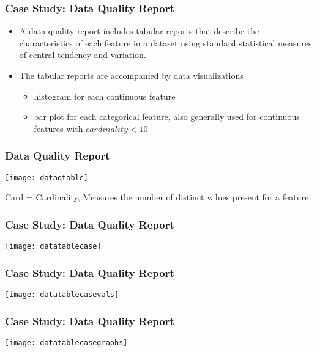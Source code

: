 \begin{frame}[fragile] \frametitle{Case Study: Data Quality Report}
\begin{itemize}
\item A data quality report includes tabular reports that describe the characteristics of each feature in a dataset using standard statistical measures of central tendency and variation. 
\item The tabular reports are accompanied by data visualizations
	\begin{itemize}
	\item histogram for each continuous feature
	\item bar plot for each categorical feature, also generally used for continuous features with $cardinality < 10$
	\end{itemize}
\end{itemize}
\end{frame}

\begin{frame}[fragile] \frametitle{Data Quality Report}
\begin{center}
\texttt{[image: dataqtable]}
\end{center}
Card = Cardinality, Measures the number of distinct values present for a feature

\end{frame}


\begin{frame}[fragile] \frametitle{Case Study: Data Quality Report}

\begin{center}
\texttt{[image: datatablecase]}
\end{center}
\end{frame}

\begin{frame}[fragile] \frametitle{Case Study: Data Quality Report}

\begin{center}
\texttt{[image: datatablecasevals]}
\end{center}
\end{frame}


\begin{frame}[fragile] \frametitle{Case Study: Data Quality Report}

\begin{center}
\texttt{[image: datatablecasegraphs]}
\end{center}
\end{frame}

